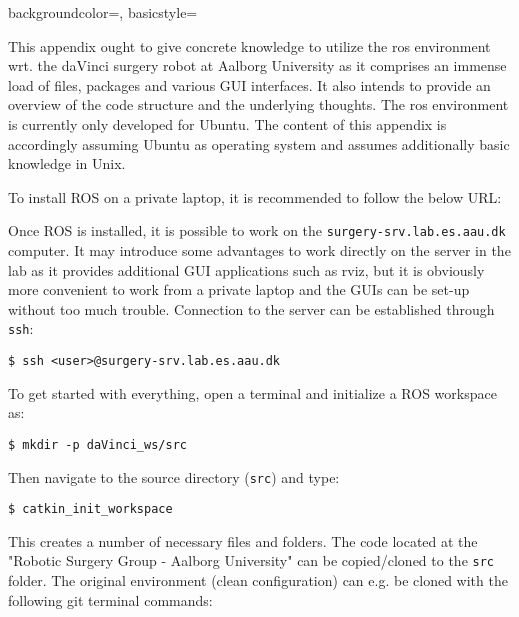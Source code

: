 {
    backgroundcolor=\color{black},
    basicstyle=\scriptsize\color{green}%
}

This appendix ought to give concrete knowledge to utilize the \gls{ros} environment wrt. the \gls{daVinci} surgery robot at Aalborg University as it comprises an immense load of files, packages and various GUI interfaces. It also intends to provide an overview of the code structure and the underlying thoughts. The \gls{ros} environment is currently only developed for Ubuntu. The content of this appendix is accordingly assuming Ubuntu as operating system and assumes additionally basic knowledge in Unix. 

To install ROS on a private laptop, it is recommended to follow the below URL:

\hspace{1cm} {}

Once ROS is installed, it is possible to work on the \texttt{surgery-srv.lab.es.aau.dk} computer. It may introduce some advantages to work directly on the server in the lab as it provides additional GUI applications such as rviz, but it is obviously more convenient to work from a private laptop and the GUIs can be set-up without too much trouble. Connection to the server can be established through \texttt{ssh}:

\hspace{1cm} \texttt{\$ ssh <user>@surgery-srv.lab.es.aau.dk}

To get started with everything, open a terminal and initialize a ROS workspace as:

\hspace{1cm} \texttt{\$ mkdir -p daVinci\_ws/src}

Then navigate to the source directory (\texttt{src}) and type:

\hspace{1cm} \texttt{\$ catkin\_init\_workspace}

This creates a number of necessary files and folders. The code located at the "Robotic Surgery Group - Aalborg University" can be copied/cloned to the \texttt{src} folder. %
The original environment (clean configuration) can e.g. be cloned with the following git terminal commands:\vspace{0.1cm}

